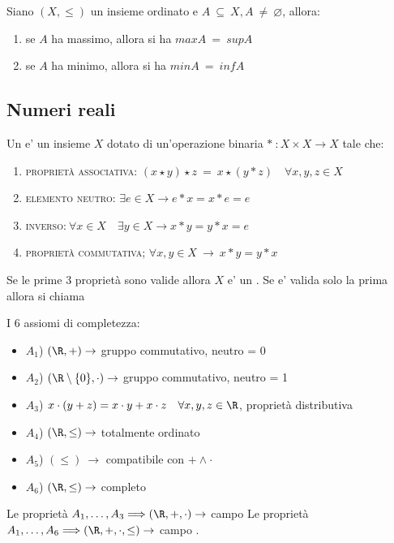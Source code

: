 \documentclass[../analisi.tex]{subfiles}
\begin{document}
\begin{defn} Siano $(X,\leq)$ un insieme ordinato e $A\ \subseteq\ X, A\ \neq\ \varnothing $, allora:
	\begin{enumerate}
		\item se $A$ ha massimo, allora si ha $max A\ =\ sup A$
		\item se $A$ ha minimo, allora si ha $min A\ =\ inf A$
	\end{enumerate}
\end{defn}

\subsection{Numeri reali}
Un  e' un insieme $X$ dotato di un'operazione binaria $*\ : X \times X \rightarrow X$ tale che:

\begin{enumerate} 
	\item \textsc{proprietà associativa:} $(x \star y) \star z\ =\ x \star (y * z) \quad \forall x,y,z \in X$
	\item \textsc{elemento neutro:} $ \exists e \in X \rightarrow e * x = x * e = e$
	\item \textsc{inverso:}$\ \forall x \in X \quad \exists y \in X \rightarrow x * y = y * x = e$
	\item \textsc{proprietà commutativa;} $ \forall x, y \in X\ \rightarrow \ x * y = y * x$
\end{enumerate}
Se le prime 3 proprietà sono valide allora $X$ e' un . Se e' valida solo la prima allora si chiama 

\begin{defn}
I 6 assiomi di completezza:
	\begin{itemize}
		\item $A_1$) $(\R, +) \rightarrow$ gruppo commutativo, neutro = 0
		\item $A_2$) $(\R \setminus \{ 0 \} , \cdot) \rightarrow$  gruppo commutativo, neutro = 1
		\item $A_3$) $ x \cdot (y+z) = x \cdot y+x \cdot z \quad \forall x,y,z \in \R$, proprietà distributiva
		\item $A_4$) $(\R, \leq ) \rightarrow $ totalmente ordinato
		\item $A_5$) $ (\leq )\ \rightarrow $ compatibile con $ + \land \cdot $
		\item $A_6$) $(\R, \leq ) \rightarrow $ completo 

	\end{itemize}
	Le proprietà $ A_1, \dots , A_3 \Longrightarrow (\R, +, \cdot) \rightarrow $ campo \newline
	Le proprietà $ A_1, \dots , A_6 \Longrightarrow (\R, +, \cdot, \leq) \rightarrow $ campo .

\end{defn}
\end{document}
